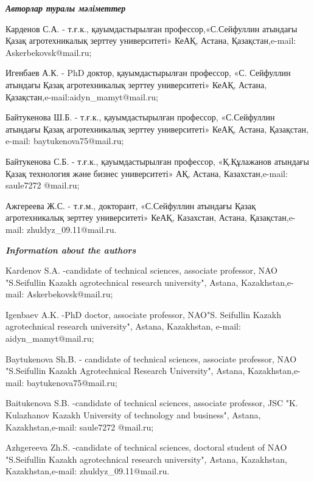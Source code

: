 \begin{info}
\hspace{1em}\emph{{\bfseries Авторлар туралы мәліметтер}}

Карденов С.А. - т.ғ.к., қауымдастырылған профессор,«С.Сейфуллин атындағы
Қазақ агротехникалық зерттеу университеті» КеАҚ, Астана,
Қазақстан,e-mail:
Askerbekovsk@mail.ru;

Игенбаев А.К. - PhD доктор, қауымдастырылған профессор, «С. Сейфуллин
атындағы Қазақ агротехникалық зерттеу университеті» КеАҚ, Астана,
Қазақстан,e-mail:aidyn\_mamyt@mail.ru;

Байтукенова Ш.Б. - т.ғ.к., қауымдастырылған профессор, «С.Сейфуллин
атындағы Қазақ агротехникалық зерттеу университеті» КеАҚ, Астана,
Қазақстан, e-mail:
baytukenova75@mail.ru;

Байтукенова С.Б. - т.ғ.к., қауымдастырылған профессор, «Қ.Құлажанов
атындағы Қазақ технология және бизнес университеті» АҚ, Астана,
Казахстан,e-mail: saule7272 @mail.ru;

Ажгереева Ж.С. - т.ғ.м., докторант, «С.Сейфуллин атындағы Қазақ
агротехникалық зерттеу университеті» КеАҚ, Казахстан, Астана,
Қазақстан,e-mail:
zhuldyz\_09.11@mail.ru.

\hspace{1em}\emph{{\bfseries Information about the authors}}

Kardenov S.A. -candidate of technical sciences, associate professor, NAO
"S.Seifullin Kazakh agrotechnical research university", Astana,
Kazakhstan,e-mail: Askerbekovsk@mail.ru;

Igenbaev A.K. -PhD doctor, associate professor, NAO"S. Seifullin Kazakh
agrotechnical research university", Astana, Kazakhstan, e-mail:
aidyn\_mamyt@mail.ru;

Baytukenova Sh.B. - candidate of technical sciences, associate
professor, NAO "S.Seifullin Kazakh Agrotechnical Research University",
Astana, Kazakhstan,e-mail: baytukenova75@mail.ru;

Baitukenova S.B. -candidate of technical sciences, associate professor,
JSC "K. Kulazhanov Kazakh University of technology and business",
Astana, Kazakhstan,e-mail: saule7272 @mail.ru;

Azhgereeva Zh.S. -candidate of technical sciences, doctoral student of
NAO "S.Seifullin Kazakh agrotechnical research university", Astana,
Kazakhstan, Kazakhstan,e-mail: zhuldyz\_09.11@mail.ru.
\end{info}
